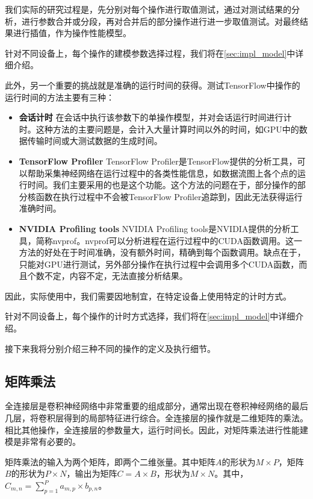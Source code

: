     我们实际的研究过程是，先分别对每个操作进行取值测试，通过对测试结果的分析，进行参数合并或分段，再对合并后的部分操作进行进一步取值测试。对最终结果进行插值，作为操作性能模型。
    
    针对不同设备上，每个操作的建模参数选择过程，我们将在\ref{sec:impl_model}中详细介绍。

    此外，另一个重要的挑战就是准确的运行时间的获得。测试TensorFlow中操作的运行时间的方法主要有三种：
    
    \begin{itemize}
        \item {\bfseries 会话计时} 在会话中执行该参数下的单操作模型，并对会话运行时间进行计时。这种方法的主要问题是，会计入大量计算时间以外的时间，如GPU中的数据传输时间或大测试数据的生成时间。
        \item {\bfseries TensorFlow Profiler} TensorFlow        Profiler是TensorFlow提供的分析工具，可以帮助采集神经网络在运行过程中的各类性能信息，如数据流图上各个点的运行时间。我们主要采用的也是这个功能。这个方法的问题在于，部分操作的部分核函数在执行过程中不会被TensorFlow Profiler追踪到，因此无法获得运行准确时间。
        \item {\bfseries NVIDIA Profiling tools} NVIDIA Profiling tools是NVIDIA提供的分析工具，简称nvprof。nvprof可以分析进程在运行过程中的CUDA函数调用。这一方法的好处在于时间准确，没有额外时间，精确到每个函数调用。缺点在于，只能对GPU进行测试，另外部分操作在执行过程中会调用多个CUDA函数，而且个数不定，内容不定，无法直接分析结果。
    \end{itemize}
    
    因此，实际使用中，我们需要因地制宜，在特定设备上使用特定的计时方式。
    
    针对不同设备上，每个操作的计时方式选择，我们将在\ref{sec:impl_model}中详细介绍。
    
    接下来我将分别介绍三种不同的操作的定义及执行细节。
    
\subsection{矩阵乘法}
\label{ssec:view_matmul}
    全连接层是卷积神经网络中非常重要的组成部分，通常出现在卷积神经网络的最后几层，将卷积层得到的局部特征进行综合。全连接层的操作就是二维矩阵的乘法。相比其他操作，全连接层的参数量大，运行时间长。因此，对矩阵乘法进行性能建模是非常有必要的。
    
    矩阵乘法的输入为两个矩阵，即两个二维张量。其中矩阵$ A $的形状为$ M \times P $，矩阵$ B $的形状为$ P \times N $，输出为矩阵$ C = A \times B $，形状为$M \times N$。其中，$ C_{m, n} = \sum_{p=1}^P{a_{m, p} \times b_{p, n}} $。
    
